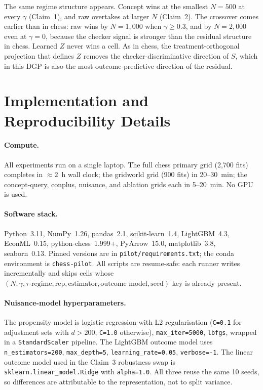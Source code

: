 \documentclass{article}
\begin{document}
The same regime structure appears. Concept wins at the smallest $N=500$ at
every $\gamma$ (Claim~1), and raw overtakes at larger $N$ (Claim~2). The
crossover comes earlier than in chess: raw wins by $N{=}1{,}000$ when
$\gamma\geq 0.3$, and by $N{=}2{,}000$ even at $\gamma{=}0$, because the
checker signal is stronger than the residual structure in chess. Learned $Z$
never wins a cell. As in chess, the treatment-orthogonal projection that
defines $Z$ removes the checker-discriminative direction of $S$, which in this
DGP is also the most outcome-predictive direction of the residual.

\section{Implementation and Reproducibility Details}
\label{app:repro}

\paragraph{Compute.} All experiments run on a single laptop. The full chess
primary grid (2{,}700 fits) completes in $\approx 2$~h wall clock; the
gridworld grid (900 fits) in 20--30~min; the concept-query, conplus, nuisance,
and ablation grids each in 5--20~min. No GPU is used.

\paragraph{Software stack.} Python~3.11, NumPy~1.26, pandas~2.1,
scikit-learn~1.4, LightGBM~4.3, EconML~0.15, python-chess~1.999+,
PyArrow~15.0, matplotlib~3.8, seaborn~0.13. Pinned versions are in
\texttt{pilot/requirements.txt}; the conda environment is
\texttt{chess-pilot}. All scripts are resume-safe: each runner writes
incrementally and skips cells whose
$(N,\gamma,\tau\text{-regime},\text{rep},\text{estimator},\text{outcome model},\text{seed})$
key is already present.

\paragraph{Nuisance-model hyperparameters.}
The propensity model is logistic regression with L2 regularisation
(\texttt{C=0.1} for adjustment sets with $d>200$, \texttt{C=1.0} otherwise),
\texttt{max\_iter=5000}, \texttt{lbfgs}, wrapped in a \texttt{StandardScaler}
pipeline. The LightGBM outcome model uses \texttt{n\_estimators=200},
\texttt{max\_depth=5}, \texttt{learning\_rate=0.05}, \texttt{verbose=-1}. The
linear outcome model used in the Claim~3 robustness swap is
\texttt{sklearn.linear\_model.Ridge} with \texttt{alpha=1.0}. All three reuse
the same 10 seeds, so differences are attributable to the representation, not
to split variance.
\end{document}
